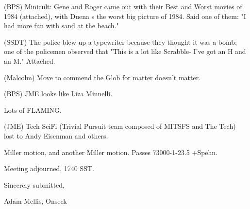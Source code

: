 \documentclass[12pt]{article}
\begin{document}
(BPS) Minicult: Gene and Roger came out with their Best and Worst movies of 1984 (attached), with Duena s the worst big picture of 1984. Said one of them: "I had more fun with sand at the beach."

(SSDT) The police blew up a typewriter because they thought it was a bomb; one of the policemen observed that "This is a lot like Scrabble- I've got an H and an M." Attached.

(Malcolm) Move to commend the Glob for matter doesn't matter.

(BPS) JME looks like Liza Minnelli.

Lots of FLAMING.

(JME) Tech SciFi (Trivial Pursuit team composed of MITSFS and The Tech) lost to Andy Eisenman and others.

Miller motion, and another Miller motion. Passes 73000-1-23.5 +Spehn.

\vspace{12pt}

\noindent
Meeting adjourned, 1740 SST.

\vspace{18pt}

\centerline{Sincerely submitted,}
\centerline{Adam Mellis, Onseck}
\end{document}

